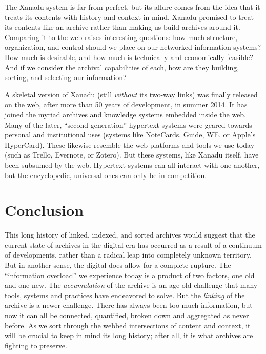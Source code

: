 The Xanadu system is far from perfect, but its allure comes from the idea that it treats its contents with history and context in mind. Xanadu promised to treat its contents like an archive rather than making us build archives around it. Comparing it to the web raises interesting questions: how much structure, organization, and control should we place on our networked information systems? How much is desirable, and how much is technically and economically feasible? And if we consider the archival capabilities of each, how are they building, sorting, and selecting our information?

A skeletal version of Xanadu (still \emph{without} its two-way links) was finally released on the web, after more than 50 years of development, in summer 2014.\autocites{carmody_pioneering_2014}{hern_worlds_2014} It has joined the myriad archives and knowledge systems embedded inside the web. Many of the later, ``second-generation'' hypertext systems were geared towards personal and institutional uses (systems like NoteCards, Guide, WE, or Apple's HyperCard).\autocite{halasz_reflections_1988} These likewise resemble the web platforms and tools we use today (such as Trello, Evernote, or Zotero). But these systems, like Xanadu itself, have been subsumed by the web. Hypertext systems can all interact with one another, but the encyclopedic, universal ones can only be in competition.

\section{Conclusion}

This long history of linked, indexed, and sorted archives would suggest that the current state of archives in the digital era has occurred as a result of a continuum of developments, rather than a radical leap into completely unknown territory. But in another sense, the digital does allow for a complete rupture. The ``information overload'' we experience today is a product of two factors, one old and one new. The \emph{accumulation} of the archive is an age-old challenge that many tools, systems and practices have endeavored to solve. But the \emph{linking} of the archive is a newer challenge. There has always been too much information, but now it can all be connected, quantified, broken down and aggregated as never before. As we sort through the webbed intersections of content and context, it will be crucial to keep in mind its long history; after all, it is what archives are fighting to preserve.

